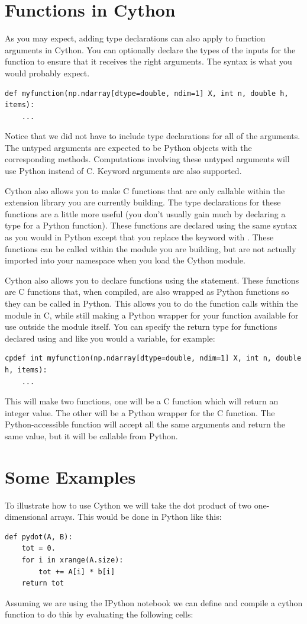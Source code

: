 \section*{Functions in Cython}
As you may expect, adding type declarations can also apply to function arguments in Cython.
You can optionally declare the types of the inputs for the function to ensure that it receives the right arguments.
The syntax is what you would probably expect.
\begin{lstlisting}
def myfunction(np.ndarray[dtype=double, ndim=1] X, int n, double h, items):
    ...
\end{lstlisting}
Notice that we did not have to include type declarations for all of the arguments.
The untyped arguments are expected to be Python objects with the corresponding methods.
Computations involving these untyped arguments will use Python instead of C.
Keyword arguments are also supported.

Cython also allows you to make C functions that are only callable within the extension library you are currently building.
The type declarations for these functions are a little more useful (you don't usually gain much by declaring a type for a Python function).
These functions are declared using the same syntax as you would in Python except that you replace the keyword  with .
These functions can be called within the module you are building, but are not actually imported into your namespace when you load the Cython module.

Cython also allows you to declare functions using the  statement.
These functions are C functions that, when compiled, are also wrapped as Python functions so they can be called in Python.
This allows you to do the function calls within the module in C, while still making a Python wrapper for your function available for use outside the module itself.
You can specify the return type for functions declared using  and  like you would a variable, for example:
\begin{lstlisting}
cpdef int myfunction(np.ndarray[dtype=double, ndim=1] X, int n, double h, items):
    ...
\end{lstlisting}
This will make two functions, one will be a C function which will return an integer value.
The other will be a Python wrapper for the C function.
The Python-accessible function will accept all the same arguments and return the same value, but it will be callable from Python.

\section*{Some Examples}
To illustrate how to use Cython we will take the dot product of two one-dimensional arrays.
This would be done in Python like this:
\begin{lstlisting}
def pydot(A, B):
    tot = 0.
    for i in xrange(A.size):
        tot += A[i] * b[i]
    return tot
\end{lstlisting}
Assuming we are using the IPython notebook we can define and compile a cython function to do this by evaluating the following cells:

